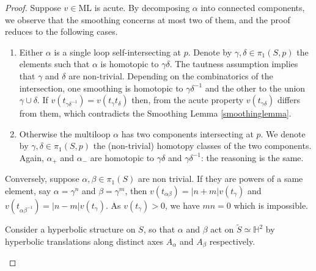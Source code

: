 \documentclass{amsart}
\newcommand{\ML}{\mathrm{ML}}
\renewcommand{\H}{\mathbb{H}}
\begin{document}
\begin{proof}
Suppose $v\in \ML$ is acute.
By decomposing $\alpha$ into connected components, we observe that the smoothing concerns at most two of them, and the proof reduces to the following cases. 

\begin{enumerate}
    \item
Either $\alpha$ is a single loop self-intersecting at $p$. Denote by $\gamma,\delta\in \pi_1(S,p)$ the elements such that $\alpha$ is homotopic to $\gamma\delta$. The tautness assumption implies that $\gamma$ and $\delta$ are non-trivial. Depending on the combinatorics of the intersection, one smoothing is homotopic to $\gamma\delta^{-1}$ and the other to the union $\gamma\cup \delta$. If $v(t_{\gamma\delta^{-1}})= v(t_\gamma t_\delta)$ then, from the acute property $v(t_{\gamma\delta})$ differs from them, which contradicts the Smoothing Lemma \ref{smoothinglemma}. 
    \item[2.]
    
Otherwise the multiloop $\alpha$ has two components intersecting at $p$. We denote by $\gamma,\delta\in \pi_1(S,p)$ the (non-trivial) homotopy classes of the two components. Again, $\alpha_+$ and $\alpha_-$ are homotopic to $\gamma\delta$ and $\gamma\delta^{-1}$: the reasoning is the same.
\end{enumerate}


Conversely, suppose $\alpha,\beta \in \pi_1(S)$ are non trivial. 
%
If they are powers of a same element, say $\alpha=\gamma^n$ and $\beta=\gamma^m$, then $v(t_{\alpha\beta})=\lvert n+m \rvert v(t_\gamma)$ and $v(t_{\alpha\beta^{-1}})=\lvert n-m\rvert v(t_\gamma)$. As $v(t_\gamma)>0$, we have $mn=0$ which is impossible.

Consider a hyperbolic structure on $S$, so that $\alpha$ and $\beta$ act on $\tilde{S}\simeq\H^2$ by hyperbolic translations along distinct axes $A_\alpha$ and $A_\beta$ respectively.

\begin{enumerate}
    

\end{enumerate}
\end{proof}
\end{document}
